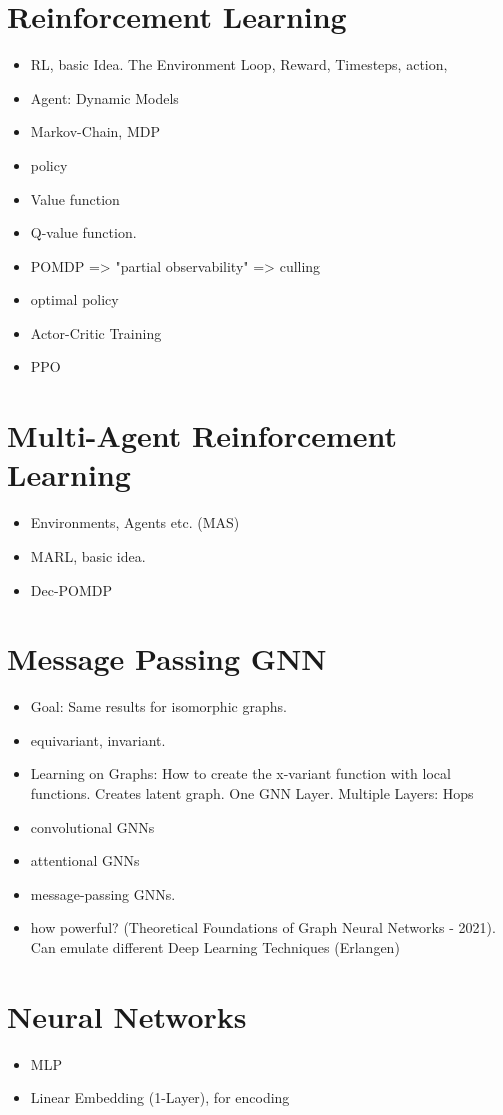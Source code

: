 \section{Reinforcement Learning}
\begin{itemize}[noitemsep,nolistsep]
	\item RL, basic Idea. The Environment Loop, Reward, Timesteps, action, 
	\item Agent: Dynamic Models
	\item Markov-Chain, MDP
	\item policy
	\item Value function
	\item Q-value function.
	\item POMDP => "partial observability" => culling
	\item optimal policy
	\item Actor-Critic Training
	\item PPO
\end{itemize}

\section{Multi-Agent Reinforcement Learning}
\begin{itemize}[noitemsep,nolistsep]
	\item Environments, Agents etc. (MAS)
	\item MARL, basic idea. 
	\item Dec-POMDP
\end{itemize}

\section{Message Passing GNN}
\begin{itemize}[noitemsep,nolistsep]
	\item Goal: Same results for isomorphic graphs.
	\item equivariant, invariant.
	\item Learning on Graphs: How to create the x-variant function with local functions. Creates latent graph. One GNN Layer. Multiple Layers: Hops
	\item convolutional GNNs
	\item attentional GNNs
	\item message-passing GNNs.
	\item how powerful? (Theoretical Foundations of Graph Neural Networks - 2021). Can emulate different Deep Learning Techniques (Erlangen)
\end{itemize}

\section{Neural Networks}
\begin{itemize}[noitemsep,nolistsep]
	\item MLP
	\item Linear Embedding (1-Layer), for encoding
\end{itemize}